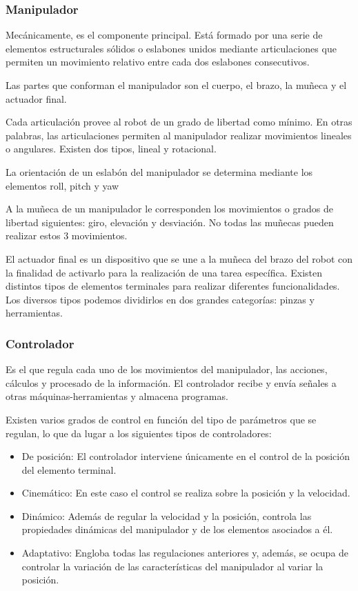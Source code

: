 \documentclass[12pt,a4paper]{report}
\begin{document}
\subsubsection{Manipulador}

Mecánicamente, es el componente principal. Está formado por una serie de
elementos estructurales sólidos o eslabones unidos mediante articulaciones
que permiten un movimiento relativo entre cada dos eslabones consecutivos. 

Las partes que conforman el manipulador son el cuerpo, el brazo, la muñeca y el
actuador final. 

Cada articulación provee al robot de un grado de libertad como mínimo. En
otras palabras, las articulaciones permiten al manipulador realizar
movimientos lineales o angulares. Existen dos tipos, lineal y rotacional. 

La orientación de un eslabón del manipulador se determina
mediante los elementos roll, pitch y yaw

A la muñeca de un manipulador le corresponden los movimientos o grados de
libertad siguientes: giro, elevación y desviación. No todas las muñecas pueden
realizar estos 3 movimientos. 

El actuador final es un dispositivo que se une a la muñeca del
brazo del robot con la finalidad de activarlo para la realización de una
tarea específica. Existen distintos tipos de elementos
terminales para realizar diferentes funcionalidades. Los diversos
tipos podemos dividirlos en dos grandes categorías: pinzas y herramientas.


\subsubsection{Controlador}
Es el que regula cada uno de los movimientos del manipulador, las acciones,
cálculos y procesado de la información. El controlador recibe y envía señales a
otras máquinas-herramientas y almacena programas.

Existen varios grados de control en función del tipo de
parámetros que se regulan, lo que da lugar a los siguientes tipos de
controladores:
\begin{itemize}
    \item De posición:
    El controlador interviene únicamente en el control de la posición del
    elemento terminal.
    \item Cinemático: 
    En este caso el control se realiza sobre la posición y la velocidad.
    \item Dinámico:
    Además de regular la velocidad y la posición, controla las propiedades
    dinámicas del manipulador y de los elementos asociados a él.
    \item Adaptativo: 
    Engloba todas las regulaciones anteriores y, además, se ocupa de controlar 
    la variación de las características del manipulador al variar la posición.
\end{itemize}
\end{document}
